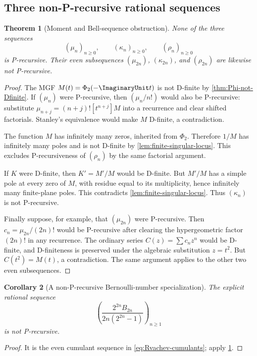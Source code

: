 \documentclass[11pt]{article}
\numberwithin{equation}{section}
\newtheorem{theorem}{Theorem}[section]
\newtheorem{corollary}[theorem]{Corollary}
\theoremstyle{definition}
\theoremstyle{remark}
\begin{document}
\subsection{Three non-P-recursive rational sequences}

\begin{theorem}[Moment and Bell-sequence obstruction]
\label{thm:moment-not-P-recursive}
None of the three sequences
\begin{equation}
 (\mu_n)_{n\ge0},\qquad
 (\kappa_n)_{n\ge0},\qquad
 (\rho_n)_{n\ge0}
 \label{eq:three-sequences}
\end{equation}
is P-recursive.  Their even subsequences
$(\mu_{2n})$, $(\kappa_{2n})$, and $(\rho_{2n})$ are likewise not
P-recursive.
\end{theorem}
\begin{proof}
The MGF $M(t)=\Phi_2(-\ImaginaryUnit t)$ is not D-finite by
\cref{thm:Phi-not-Dfinite}.  If $(\mu_n)$ were P-recursive, then
$(\mu_n/n!)$ would also be P-recursive: substitute
$\mu_{n+j}=(n+j)![t^{n+j}]M$ into a recurrence and clear shifted factorials.
Stanley's equivalence would make $M$ D-finite, a contradiction.

The function $M$ has infinitely many zeros, inherited from $\Phi_2$.
Therefore $1/M$ has infinitely many poles and is not D-finite by
\cref{lem:finite-singular-locus}.  This excludes P-recursiveness of
$(\rho_n)$ by the same factorial argument.

If $K$ were D-finite, then $K'=M'/M$ would be D-finite.  But $M'/M$ has a
simple pole at every zero of $M$, with residue equal to its multiplicity, hence
infinitely many finite-plane poles.  This contradicts
\cref{lem:finite-singular-locus}.  Thus $(\kappa_n)$ is not P-recursive.

Finally suppose, for example, that $(\mu_{2n})$ were P-recursive.  Then
$c_n=\mu_{2n}/(2n)!$ would be P-recursive after clearing the hypergeometric
factor $(2n)!$ in any recurrence.  The ordinary series
$C(z)=\sum c_nz^n$ would be D-finite, and D-finiteness is preserved under the
algebraic substitution $z=t^2$.  But $C(t^2)=M(t)$, a contradiction.  The same
argument applies to the other two even subsequences.
\end{proof}

\begin{corollary}[A non-P-recursive Bernoulli-number specialization]
\label{cor:Bernoulli-specialization-nonP}
The explicit rational sequence
\begin{equation}
 \left(
 \frac{2^{2n}B_{2n}}{2n(2^{2n}-1)}
 \right)_{n\ge1}
 \label{eq:weighted-Bernoulli-sequence}
\end{equation}
is not P-recursive.
\end{corollary}
\begin{proof}
It is the even cumulant sequence in \eqref{eq:Rvachev-cumulants}; apply
\cref{thm:moment-not-P-recursive}.
\end{proof}
\end{document}
